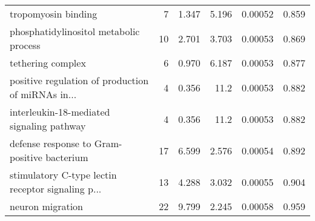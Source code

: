 \begin{longtable}{lrrrrr}
                               tropomyosin binding &                       7 &                   1.347 &      5.196 &              0.00052 &                0.859 \\
            phosphatidylinositol metabolic process &                      10 &                   2.701 &      3.703 &              0.00053 &                0.869 \\
                                 tethering complex &                       6 &                   0.970 &      6.187 &              0.00053 &                0.877 \\
 positive regulation of production of miRNAs in... &                       4 &                   0.356 &       11.2 &              0.00053 &                0.882 \\
         interleukin-18-mediated signaling pathway &                       4 &                   0.356 &       11.2 &              0.00053 &                0.882 \\
       defense response to Gram-positive bacterium &                      17 &                   6.599 &      2.576 &              0.00054 &                0.892 \\
 stimulatory C-type lectin receptor signaling p... &                      13 &                   4.288 &      3.032 &              0.00055 &                0.904 \\
                                  neuron migration &                      22 &                   9.799 &      2.245 &              0.00058 &                0.959 \\
\end{longtable}
